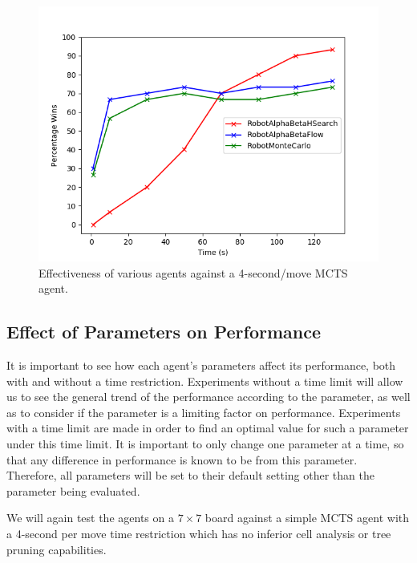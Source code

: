 \begin{figure}
    \centering
    \includegraphics[scale = 0.6]{images/timeComparison.png}
    \caption{Effectiveness of various agents against a 4-second/move MCTS agent.}
    \label{fig:timecomparison}
\end{figure}



















\subsection{Effect of Parameters on Performance}
It is important to see how each agent's parameters affect its performance, both with and without a time restriction. Experiments without a time limit will allow us to see the general trend of the performance according to the parameter, as well as to consider if the parameter is a limiting factor on performance. Experiments with a time limit are made in order to find an optimal value for such a parameter under this time limit. It is important to only change one parameter at a time, so that any difference in performance is known to be from this parameter. Therefore, all parameters will be set to their default setting other than the parameter being evaluated.

We will again test the agents on a $7\times7$ board against a simple MCTS agent with a 4-second per move time restriction which has no inferior cell analysis or tree pruning capabilities.

